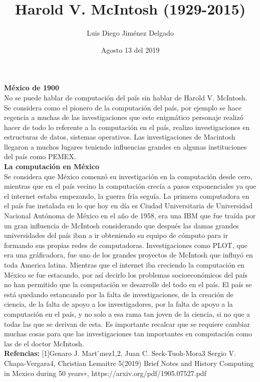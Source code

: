 \documentclass[12pt]{article}
\title{Harold V. McIntosh (1929-2015)}
\author{Luis Diego Jiménez Delgado}
\date{Agosto 13 del 2019}
\begin{document}
\maketitle

\textbf{México de 1900}
\\No se puede hablar de computación del país sin hablar de Harold V. McIntosh. Se considera como el pionero de la computación del país, por ejemplo se hace regencia a muchas de las investigaciones que este enigmático personaje realizó hacer de todo lo referente a la computación en el país, realizo investigaciones en estructuras de datos, sistemas operativos.
Las investigaciones de Macintosh llegaron a muchos lugares teniendo influencias grandes en algunas instituciones del país como PEMEX. 
\\
\textbf{La computación en México }
\\Se considera que México comenzó su investigación en la computación desde cero, mientras que en el país vecino la computación crecía a pasos exponenciales ya que el internet estaba empezando, la guerra fría seguía.  La primera computadora en el país fue instalada en lo que hoy en día es Ciudad Universitaria de Universidad Nacional Autónoma de México en el año de 1958, era una IBM que fue traída por un gran influencia de McIntosh considerando que después las damas grandes universidades del país iban a ir obteniendo su equipo de cómputo para ir formando sus propias redes de computadoras. 
Investigaciones como PLOT, que era una gráficadora,  fue uno de los grandes proyectos de McIntosh que influyó en toda America latina. Mientras que el internet iba creciendo la computación en México se fue estacando, por así decirlo los problemas socioeconómicos del país no han permitido que la computación se desarrolle del todo en el país. El país se está quedando estancando por la falta de investigaciones, de la creación de ciencia, de la falta de apoyo a los investigadores, por la falta de apoyo a la computación en el país, y no solo a esa rama tan joven de la ciencia, si no que a todas las que se derivan de esta. Es importante recalcar que se requiere cambiar muchas cosas para que las investigaciones tan importantes en computación como las de el doctor McIntosh.
\\
\textbf{Refencias:}
[1]Genaro J. Mart ́ınez1,2, Juan C. Seck-Tuoh-Mora3 Sergio V. Chapa-Vergara4, Christian Lemaitre 5(2019) Brief Notes and History Computing in Mexico during 50 years∗, https://arxiv.org/pdf/1905.07527.pdf
\end{document}
